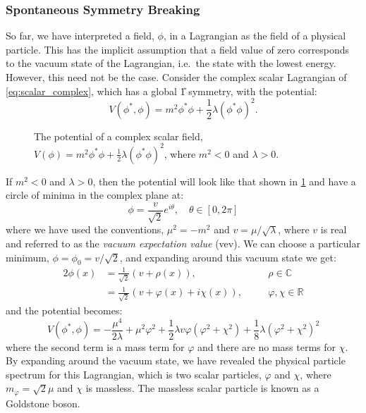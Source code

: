 \subsubsection{Spontaneous Symmetry Breaking}
So far, we have interpreted a field, $\phi$, in a Lagrangian as the field of a physical particle. This has the implicit assumption that a field value of zero corresponds to the vacuum state of the Lagrangian, i.e.\ the state with the lowest energy. However, this need not be the case. Consider the complex scalar Lagrangian of \cref{eq:scalar_complex}, which has a global \U{1} symmetry, with the potential:
\begin{equation}
  V(\phi^*, \phi) = m^2 \phi^*\phi + \frac{1}{2}\lambda (\phi^*\phi)^2 .
  \label{eq:scalar_complex_potential}
\end{equation}
\begin{figure}
  \centering
  \caption[Higgs Field Potential]{The potential of a complex scalar field, $V(\phi) = m^2 \phi^*\phi + \frac{1}{2}\lambda (\phi^*\phi)^2$, where $m^2 < 0$ and $\lambda > 0$.}\label{fig:sombrero}
\end{figure}
If $m^2 < 0$ and $\lambda > 0$, then the potential will look like that shown in \cref{fig:sombrero} and have a circle of minima in the complex plane at:
\begin{equation}
  \phi = \frac{v}{\sqrt{2}}e^{i\theta},\quad \theta \in [0, 2\pi]
  \label{eq:phi_vacuum_state}
\end{equation}
where we have used the conventions, $\mu^2 = -m^2$ and $v = \mu / \sqrt{\lambda}$, where $v$ is real and referred to as the \textit{vacuum expectation value} (vev). We can choose a particular minimum, $\phi = \phi_0 = v / \sqrt{2}$, and expanding around this vacuum state we get:
\begin{alignat}{2}
  \phi (x) &= \frac{1}{\sqrt{2}} (v + \rho(x) ), \quad &&\rho \in \mathbb{C} \\
  &= \frac{1}{\sqrt{2}} (v + \varphi (x) + i \chi (x) ), \quad &&\varphi,\chi \in \mathbb{R}
\end{alignat}
and the potential becomes:
\begin{equation}
  V(\phi^*, \phi) = -\frac{\mu^4}{2\lambda} + \mu^2 \varphi^2 + \frac{1}{2} \lambda v \varphi (\varphi^2 + \chi^2) + \frac{1}{8} \lambda (\varphi^2 + \chi^2)^2
  \label{eq:scalar_complex_potential_expanded}
\end{equation}
where the second term is a mass term for $\varphi$ and there are no mass terms for $\chi$. By expanding around the vacuum state, we have revealed the physical particle spectrum for this Lagrangian, which is two scalar particles, $\varphi$ and $\chi$, where $m_\varphi = \sqrt{2}\mu$ and $\chi$ is massless. The massless scalar particle is known as a Goldstone boson.



